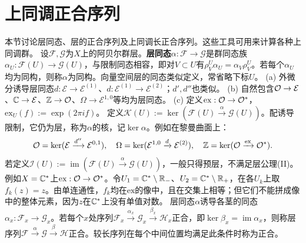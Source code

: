 \section{上同调正合序列}
本节讨论层同态、层的正合序列及上同调长正合序列。这些工具可用来计算各种上同调群。
设$\mathcal F,\mathcal G$为$X$上的阿贝尔群层。\textbf{层同态}$\alpha:\mathcal F\to\mathcal G$是群同态族$\alpha_U:\mathcal F(U)\to\mathcal G(U)$，与限制同态相容，即对$V\subset U$有$\rho_V^U\alpha_U=\alpha_V\rho_V^U$。若每个$\alpha_U$均为同构，则称$\alpha$为同构。向量空间层的同态类似定义，常省略下标$U$。
(a) 外微分诱导层同态$d:\mathcal E\to\mathcal E^{(1)}$、$d:\mathcal E^{(1)}\to\mathcal E^{(2)}$；$d',d''$也类似。
(b) 自然包含$\mathcal O\to\mathcal E$、$\mathbb C\to\mathcal E$、$\mathbb Z\to\mathcal O$、$\Omega\to\mathcal E^{1,0}$等均为层同态。
(c) 定义$\mathrm{ex}:\mathcal O\to\mathcal O^*$，$\mathrm{ex}_U(f):=\exp(2\pi if)$。
定义$\mathcal K(U):=\ker(\mathcal F(U)\xrightarrow\alpha\mathcal G(U))$。配诱导限制，它仍为层，称为$\alpha$的核，记$\ker\alpha$。例如在黎曼曲面上：
\[
\mathcal O=\ker(\mathcal E\xrightarrow{d''}\mathcal E^{0,1}),\quad
\Omega=\ker(\mathcal E^{1,0}\xrightarrow d\mathcal E^{(2)}),\quad
\mathbb Z=\ker(\mathcal O\xrightarrow{\mathrm{ex}}\mathcal O^*).
\]
若定义$\mathcal I(U):=\operatorname{im}(\mathcal F(U)\xrightarrow\alpha\mathcal G(U))$，一般只得预层，不满足层公理(II)。例如$X=\mathbb C^*$上$\mathrm{ex}:\mathcal O\to\mathcal O^*$。令$U_1=\mathbb C^*\setminus\mathbb R_-$、$U_2=\mathbb C^*\setminus\mathbb R_+$，在各$U_k$上取$f_k(z)=z$。由单连通性，$f_k$均在$\mathrm{ex}$的像中，且在交集上相等；但它们不能拼成像中的整体元素，因为$z$在$\mathbb C^*$上没有单值对数。
层同态$\alpha$诱导各茎的同态$\alpha_x:\mathcal F_x\to\mathcal G_x$。若每个$x$处序列$\mathcal F_x\xrightarrow{\alpha_x}\mathcal G_x\xrightarrow{\beta_x}\mathcal H_x$正合，即$\ker\beta_x=\operatorname{im}\alpha_x$，则称层序列$\mathcal F\xrightarrow\alpha\mathcal G\xrightarrow\beta\mathcal H$正合。较长序列在每个中间位置均满足此条件时称为正合。

